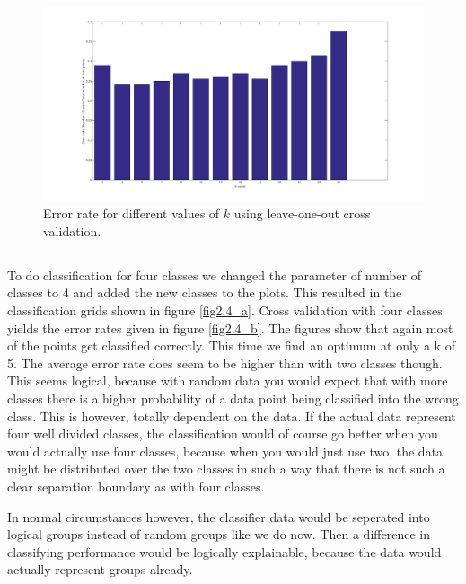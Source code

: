 \documentclass[10pt]{article}
\begin{document}
\begin{figure}[H]
 \centering
 \includegraphics[width=\textwidth]{assign2_3.png}
 \caption{Error rate for different values of $k$ using leave-one-out cross validation.}
 \label{fig2.3}
\end{figure}

\subsection{}
To do classification for four classes we changed the parameter of number of classes to 4 and added the new classes to the plots. This resulted in the classification grids shown in figure \ref{fig2.4_a}. Cross validation with four classes yields the error rates given in figure \ref{fig2.4_b}. The figures show that again most of the points get classified correctly. This time we find an optimum at only a k of 5. The average error rate does seem to be higher than with two classes though. This seems logical, because with random data you would expect that with more classes there is a higher probability of a data point being classified into the wrong class. This is however, totally dependent on the data. If the actual data represent four well divided classes, the classification would of course go better when you would actually use four classes, because when you would just use two, the data might be distributed over the two classes in such a way that there is not such a clear separation boundary as with four classes. 

In normal circumstances however, the classifier data would be seperated into logical groups instead of random groups like we do now. Then a difference in classifying performance would be logically explainable, because the data would actually represent groups already.
\end{document}
